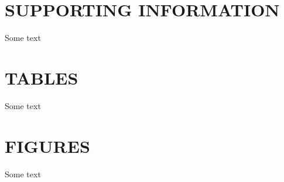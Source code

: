 \documentclass[letterpaper,12pt]{article}
\begin{document}
\section*{SUPPORTING INFORMATION}
\par Some text




\clearpage
\section*{TABLES}
\par Some text




\clearpage
\begin{singlespace}


\end{singlespace}




\clearpage
\section*{FIGURES}
\par Some text
\end{document}
